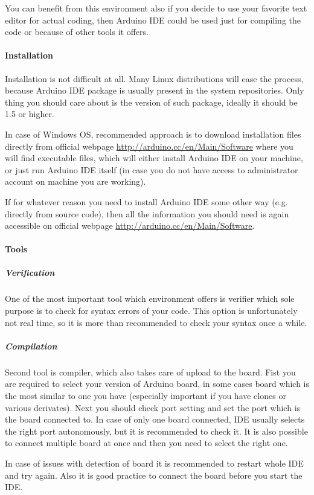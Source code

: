 \documentclass[12pt,titlepage]{article}
\begin{document}
	You can benefit from this environment also if you decide to use your favorite text editor for actual coding, then Arduino IDE could be used just for compiling the code or because of other tools it offers.
		\paragraph{Installation}
		Installation is not difficult at all. Many Linux distributions will ease the process, because Arduino IDE package is usually present in the system repositories. Only thing you should care about is the version of such package, ideally it should be 1.5 or higher.

		In case of Windows OS, recommended approach is to download installation files directly from official webpage \url{http://arduino.cc/en/Main/Software} where you will find executable files, which will either install Arduino IDE on your machine, or just run Arduino IDE itself (in case you do not have access to administrator account on machine you are working).

		If for whatever reason you need to install Arduino IDE some other way (e.g. directly from source code), then all the information you should need is again accessible on official webpage \url{http://arduino.cc/en/Main/Software}.
		\paragraph{Tools}
		\subparagraph{Verification}
		One of the most important tool which environment offers is verifier which sole purpose is to  check for syntax errors of your code. This option is unfortunately not real time, so it is more than recommended to check your syntax once a while.
		\subparagraph{Compilation}
		Second tool is compiler, which also takes care of upload to the board. Fist you are required to select your version of Arduino board, in some cases board which is the most similar to one you have (especially important if you have clones or various derivates). Next you should check port setting and set the port which is the board connected to. In case of only one board connected, IDE usually selects the right port autonomously, but it is recommended to check it. It is also possible to connect multiple board at once and then you need to select the right one.

		In case of issues with detection of board it is recommended to restart whole IDE and try again. Also it is good practice to connect the board before you start the IDE.
\end{document}
